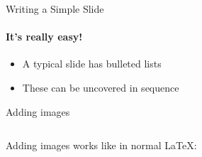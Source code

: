 \documentclass[10pt,aspectratio=169]{beamer}
\begin{document}
\begin{frame}[fragile]{Writing a Simple Slide}
\framesubtitle{It's really easy!}
\begin{itemize}[<+->]
\item A typical slide has bulleted lists
\item These can be uncovered in sequence
\end{itemize}
\end{frame}

\begin{frame}[fragile]{Adding images}
\begin{columns}
\begin{column}{0.7\textwidth}
Adding images works like in normal \LaTeX:
\end{column}
\begin{column}{0.3\textwidth}
\end{column}
\end{columns}
\end{frame}
\end{document}
